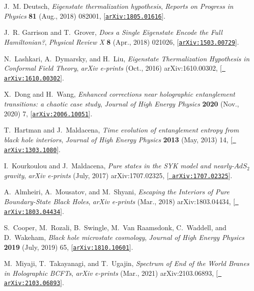 \documentclass[a4paper,11pt]{article}
\begin{document}
\begin{thebibliography}{100}
J.~M. {Deutsch}, {\it {Eigenstate thermalization hypothesis}},  {\em Reports on
  Progress in Physics} {\bf 81} (Aug., 2018) 082001,
  [\href{http://arxiv.org/abs/1805.01616}{{\tt arXiv:1805.01616}}].

J.~R. {Garrison} and T.~{Grover}, {\it {Does a Single Eigenstate Encode the
  Full Hamiltonian?}},  {\em Physical Review X} {\bf 8} (Apr., 2018) 021026,
  [\href{http://arxiv.org/abs/1503.00729}{{\tt arXiv:1503.00729}}].

N.~{Lashkari}, A.~{Dymarsky}, and H.~{Liu}, {\it {Eigenstate Thermalization
  Hypothesis in Conformal Field Theory}},  {\em arXiv e-prints} (Oct., 2016)
  arXiv:1610.00302, [\href{http://arxiv.org/abs/1610.00302}{{\tt
  arXiv:1610.00302}}].

X.~{Dong} and H.~{Wang}, {\it {Enhanced corrections near holographic
  entanglement transitions: a chaotic case study}},  {\em Journal of High
  Energy Physics} {\bf 2020} (Nov., 2020) 7,
  [\href{http://arxiv.org/abs/2006.10051}{{\tt arXiv:2006.10051}}].

T.~{Hartman} and J.~{Maldacena}, {\it {Time evolution of entanglement entropy
  from black hole interiors}},  {\em Journal of High Energy Physics} {\bf 2013}
  (May, 2013) 14, [\href{http://arxiv.org/abs/1303.1080}{{\tt
  arXiv:1303.1080}}].

I.~{Kourkoulou} and J.~{Maldacena}, {\it {Pure states in the SYK model and
  nearly-$AdS_2$ gravity}},  {\em arXiv e-prints} (July, 2017)
  arXiv:1707.02325, [\href{http://arxiv.org/abs/1707.02325}{{\tt
  arXiv:1707.02325}}].

A.~{Almheiri}, A.~{Mousatov}, and M.~{Shyani}, {\it {Escaping the Interiors of
  Pure Boundary-State Black Holes}},  {\em arXiv e-prints} (Mar., 2018)
  arXiv:1803.04434, [\href{http://arxiv.org/abs/1803.04434}{{\tt
  arXiv:1803.04434}}].

S.~{Cooper}, M.~{Rozali}, B.~{Swingle}, M.~{Van Raamsdonk}, C.~{Waddell}, and
  D.~{Wakeham}, {\it {Black hole microstate cosmology}},  {\em Journal of High
  Energy Physics} {\bf 2019} (July, 2019) 65,
  [\href{http://arxiv.org/abs/1810.10601}{{\tt arXiv:1810.10601}}].

M.~{Miyaji}, T.~{Takayanagi}, and T.~{Ugajin}, {\it {Spectrum of End of the
  World Branes in Holographic BCFTs}},  {\em arXiv e-prints} (Mar., 2021)
  arXiv:2103.06893, [\href{http://arxiv.org/abs/2103.06893}{{\tt
  arXiv:2103.06893}}].


\end{thebibliography}
\end{document}
